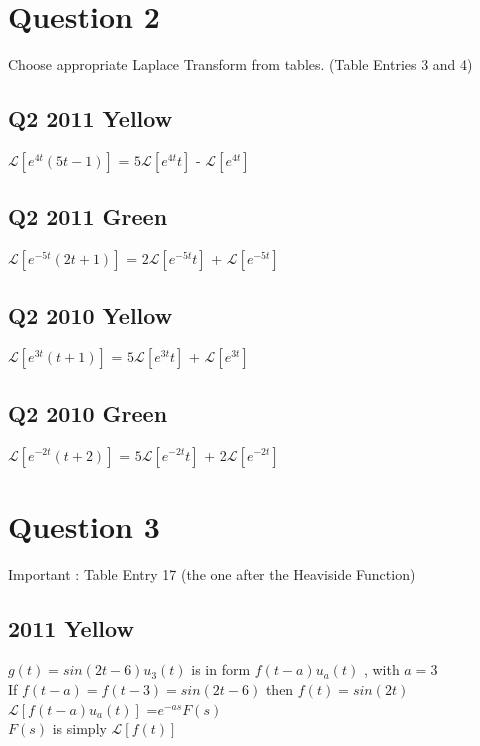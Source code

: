 \documentclass[11pt,a4paper,titlepage,oneside,openany]{article}
\numberwithin{equation}{section}
\numberwithin{algorithm}{section}
\numberwithin{figure}{section}
\numberwithin{table}{section}
\begin{document}
\section*{Question 2}
Choose appropriate Laplace Transform from tables. (Table Entries 3 and 4)
\subsection*{Q2 2011 Yellow}
$\mathcal{L}[e^{4t}(5t-1)]$ = $5\mathcal{L}[e^{4t}t]$ - $\mathcal{L}[e^{4t}]$
\subsection*{Q2 2011 Green}
$\mathcal{L}[e^{-5t}(2t+1)]$ = $2\mathcal{L}[e^{-5t}t]$ + $\mathcal{L}[e^{-5t}]$
\subsection*{Q2 2010 Yellow}

$\mathcal{L}[e^{3t}(t+1)]$ = $5\mathcal{L}[e^{3t}t]$ + $\mathcal{L}[e^{3t}]$
\subsection*{Q2 2010 Green}

$\mathcal{L}[e^{-2t}(t+2)]$ = $5\mathcal{L}[e^{-2t}t]$ + 2$\mathcal{L}[e^{-2t}]$

\newpage
\section*{Question 3}
Important : Table Entry 17 (the one after the Heaviside Function)
\subsection*{2011 Yellow}
$g(t) = sin(2t - 6)u_3(t)$ is in form $f(t-a)u_a(t)$ , with $a=3$ \\
If $f(t-a) = f(t-3) = sin(2t - 6)$ then $f(t)= sin(2t)$ \\
$\mathcal{L}[f(t-a)u_a(t)]$ =$e^{-as}F(s)$ \\
$F(s)$ is simply $\mathcal{L}[f(t)]$\\
\end{document}
